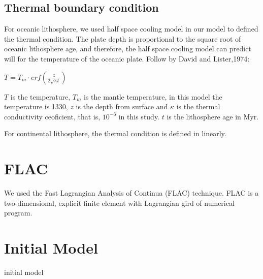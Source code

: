 \subsection{Thermal boundary condition}

For oceanic lithosphere, we used half space cooling model in our model to defined the thermal condition. 
The plate depth is proportional to the square root of oceanic lithosphere age, and therefore, the half space cooling model can predict will for the temperature of the oceanic plate.
Follow by David and Lister,1974:

$T=T_m\cdot {erf}(\frac{z}{2\sqrt{\kappa t}})$

$T$ is the temperature, $T_m$ is the mantle temperature, in this model the temperature is 1330,
$z$ is the depth from surface and $\kappa$ is the thermal conductivity ceoficient, that is, $10^{-6}$ in this study.
$t$ is the lithosphere age in Myr.


For continental lithosphere, the thermal condition is defined in linearly.


\section{FLAC}

We used the Fast Lagrangian Analysis of Continua (FLAC) technique. FLAC is a two-dimensional, explicit finite element with Lagrangian gird of numerical program.  

\section{Initial Model}

initial model


